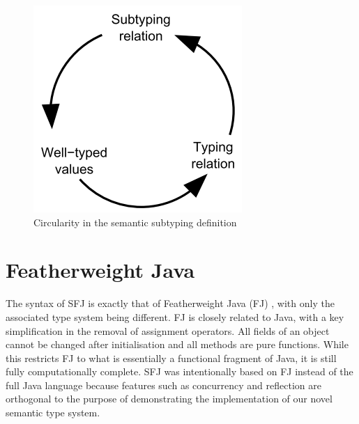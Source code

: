 \documentclass{l4proj}
\begin{document}
\begin{figure}
    \centering
    \includegraphics[width=0.4\linewidth]{images/circularity.PNG}
    \caption{Circularity in the semantic subtyping definition \citep{Castagna2005}}
    \label{fig:circ}
\end{figure}

\section{Featherweight Java}

The syntax of SFJ is exactly that of Featherweight Java (FJ) \citep{Igarashi1999}, with only the associated type system being different.
FJ is closely related to Java, with a key simplification in the removal of assignment operators.
All fields of an object cannot be changed after initialisation and all methods are pure functions.
While this restricts FJ to what is essentially a functional fragment of Java, it is still fully computationally complete.
SFJ was intentionally based on FJ instead of the full Java language because features such as concurrency and reflection are orthogonal to the purpose of demonstrating the implementation of our novel semantic type system.
\end{document}
